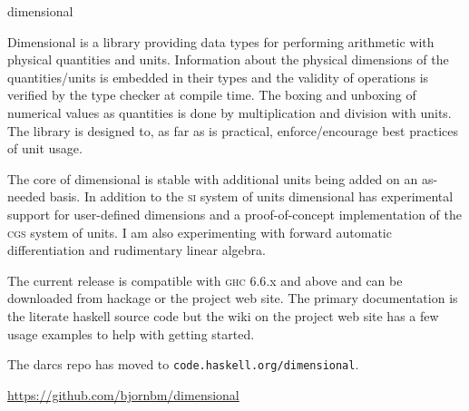 \begin{hcarentry}[updated]{dimensional}
\label{dimensional}
\makeheader

Dimensional is a library providing data types for performing
arithmetic with physical quantities and units. Information about
the physical dimensions of the quantities/units is embedded in their
types and the validity of operations is verified by the type checker
at compile time. The boxing and unboxing of numerical values as
quantities is done by multiplication and division with units. The
library is designed to, as far as is practical, enforce/encourage
best practices of unit usage.

The core of dimensional is stable with additional units being added
on an as-needed basis. In addition to the \textsc{si} system of
units dimensional has experimental support for user-defined dimensions
and a proof-of-concept implementation of the \textsc{cgs} system
of units. I am also experimenting with forward automatic differentiation
and rudimentary linear algebra.

The current release is compatible with \textsc{ghc} 6.6.x and
above and can be downloaded from hackage or the project web site.
The primary documentation is the literate haskell source code but
the wiki on the project web site has a few usage examples to help
with getting started.

The darcs repo has moved to \texttt{code.haskell.org/dimensional}.

\FurtherReading
 \url{https://github.com/bjornbm/dimensional}
\end{hcarentry}
